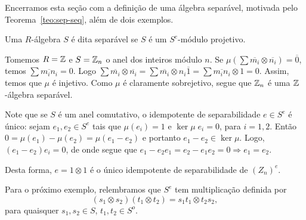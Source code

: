 Encerramos esta seção com a definição de uma álgebra separável, motivada pelo Teorema~\ref{teo:sep-seq}, além de dois exemplos.

\begin{defn}
Uma $R$-álgebra $S$ é dita separável se $S$ é um $S^e$-módulo projetivo.
\end{defn}

\begin{exemplo}
Tomemos $R = \mathbb{Z}$ e $S = \mathbb{Z}_n$ o anel dos inteiros módulo $n$. Se $\mu\left(\sum \overline{m_i} \otimes \overline{n_i}\right) = \overline{0}$, temos $\sum \overline{m_in_i} = 0$. Logo $\sum \overline{m_i} \otimes \overline{n_i} = \sum \overline{m_i} \otimes n_i \overline{1} = \sum \overline{m_i n_i} \otimes 1 = 0$. Assim, temos que $\mu$ é injetivo. Como $\mu$ é claramente sobrejetivo, segue que $\mathbb{Z}_n$ é uma $\mathbb{Z}$-álgebra separável.

Note que se $S$ é um anel comutativo, o idempotente de separabilidade $e \in S^e$ é único: sejam $e_1, e_2 \in S^e$ tais que $\mu(e_i) = 1$ e $\ker \mu \; e_i = 0$, para $i = 1, 2$. Então $0 = \mu(e_1) - \mu(e_2) = \mu(e_1 - e_2)$ e portanto $e_1 - e_2 \in \ker \mu$. Logo, $(e_1 - e_2)e_i = 0$, de onde segue que $e_1 - e_2e_1 = e_2 - e_1e_2 = 0 \Rightarrow e_1 = e_2$.

Desta forma, $e=1\otimes 1$ é o único idempotente de separabilidade de $(Z_n)^e$.
\end{exemplo}

Para o próximo exemplo, relembramos que $S^e$ tem multiplicação definida por
\[(s_1\otimes s_2)(t_1 \otimes t_2) = s_1 t_1 \otimes t_2s_2,\]
para quaisquer $s_1,s_2 \in S$, $t_1, t_2 \in S^o$.

